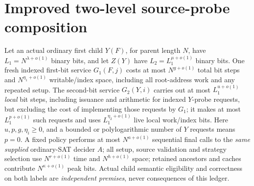 \documentclass[11pt]{article}
\begin{document}
\section{Improved two-level source-probe composition}
Let an actual ordinary first child \(Y(F)\), for parent length \(N\),
have \(L_1=N^{\lambda+o(1)}\) binary bits, and let
\(Z(Y)\) have \(L_2=L_1^{\mu+o(1)}\) binary bits.
One fresh indexed first-bit service \(G_1(F,j)\) costs at most
\(N^{g+o(1)}\) total bit steps and
\(N^{\eta_1+o(1)}\) writable/index space, including all
root-address work and any repeated setup. The second-bit
service \(G_2(Y,i)\) carries out at most
\(L_1^{u+o(1)}\) \emph{local} bit steps, including issuance
and arithmetic for indexed \(Y\)-probe requests, but excluding
the cost of implementing those requests by \(G_1\);
it makes at most \(L_1^{p+o(1)}\) such requests and uses
\(L_1^{\eta_2+o(1)}\) live local work/index bits.
Here \(u,p,g,\eta_i\ge0\), and a bounded or polylogarithmic
number of \(Y\) requests means \(p=0\).
A fixed policy performs at most \(N^{a+o(1)}\) sequential final
calls to the \emph{same supplied} ordinary-SAT decider \(A\);
all setup, source validation and strategy selection use
\(N^{r+o(1)}\) time and \(N^{h+o(1)}\) space; retained
ancestors and caches contribute \(N^{\kappa+o(1)}\) peak bits.
Actual child semantic eligibility and correctness on both
labels are \emph{independent premises}, never consequences of this ledger.
\end{document}
